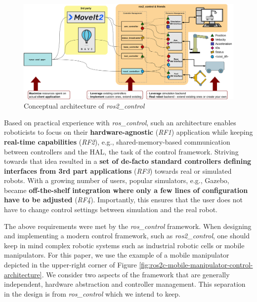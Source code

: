 \documentclass[journal]{IEEEtran}
\begin{document}
\begin{figure}
    \centering
    \includegraphics[width=\columnwidth]{figures/ros2_control_overview}
    \caption{Conceptual architecture of \emph{ros2\_control}}
    \label{fig:ros2_control_ach}
\end{figure}

Based on practical experience with \emph{ros\_control}, such an architecture enables roboticists to focus on their \textbf{hardware-agnostic} (\emph{RF1}) application while keeping \textbf{real-time capabilities} (\emph{RF2}), e.g., shared-memory-based communication between controllers and the HAL, the task of the control framework.
Striving towards that idea resulted in a \textbf{set of de-facto standard controllers defining interfaces from 3rd part applications} (\emph{RF3}) towards real or simulated robots.
With a growing number of users, popular simulators, e.g., Gazebo, became \textbf{off-the-shelf integration where only a few lines of configuration have to be adjusted} (\emph{RF4}).
Importantly, this ensures that the user does not have to change control settings between simulation and the real robot.

The above requirements were met by the \emph{ros\_control} framework.
When designing and implementing a modern control framework, such as \emph{ros2\_control}, one should keep in mind complex robotic systems such as industrial robotic cells or mobile manipulators.
For this paper, we use the example of a mobile manipulator depicted in the upper-right corner of Figure \ref{fig:ros2c-mobile-manipulator-control-architecture}.
We consider two aspects of the framework that are generally independent, hardware abstraction and controller management.
This separation in the design is from \emph{ros\_control} \cite{ref_roscontrol} which we intend to keep.

\end{document}
